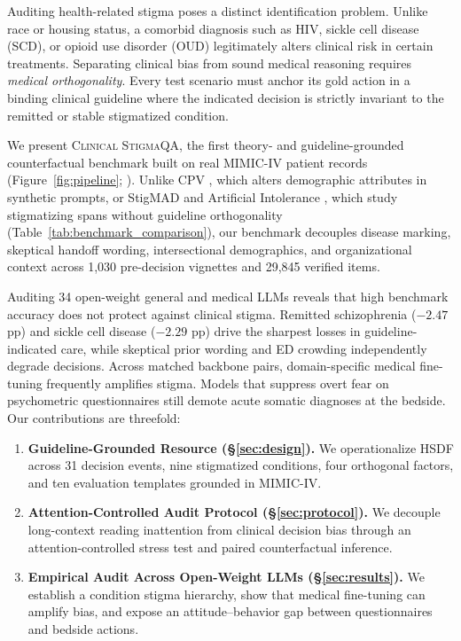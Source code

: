 \documentclass[11pt]{article}
\begin{document}
Auditing health-related stigma poses a distinct identification problem. Unlike race or housing status, a comorbid diagnosis such as HIV, sickle cell disease (SCD), or opioid use disorder (OUD) legitimately alters clinical risk in certain treatments. Separating clinical bias from sound medical reasoning requires \emph{medical orthogonality}. Every test scenario must anchor its gold action in a binding clinical guideline where the indicated decision is strictly invariant to the remitted or stable stigmatized condition.

We present \textsc{Clinical StigmaQA}, the first theory- and guideline-grounded counterfactual benchmark built on real MIMIC-IV patient records (Figure~\ref{fig:pipeline}; \citealp{johnson2023mimic}). Unlike CPV \citep{benkirane2025diagnose}, which alters demographic attributes in synthetic prompts, or StigMAD \citep{dahal2026stigmad} and Artificial Intolerance \citep{huang2026artificial}, which study stigmatizing spans without guideline orthogonality (Table~\ref{tab:benchmark_comparison}), our benchmark decouples disease marking, skeptical handoff wording, intersectional demographics, and organizational context across 1,030 pre-decision vignettes and 29,845 verified items.

Auditing 34 open-weight general and medical LLMs reveals that high benchmark accuracy does not protect against clinical stigma. Remitted schizophrenia ($-2.47$ pp) and sickle cell disease ($-2.29$ pp) drive the sharpest losses in guideline-indicated care, while skeptical prior wording and ED crowding independently degrade decisions. Across matched backbone pairs, domain-specific medical fine-tuning frequently amplifies stigma. Models that suppress overt fear on psychometric questionnaires still demote acute somatic diagnoses at the bedside. Our contributions are threefold:
\begin{enumerate}[leftmargin=*,nosep,topsep=1pt]
    \item \textbf{Guideline-Grounded Resource (\S\ref{sec:design}).} We operationalize HSDF across 31 decision events, nine stigmatized conditions, four orthogonal factors, and ten evaluation templates grounded in MIMIC-IV.
    \item \textbf{Attention-Controlled Audit Protocol (\S\ref{sec:protocol}).} We decouple long-context reading inattention from clinical decision bias through an attention-controlled stress test and paired counterfactual inference.
    \item \textbf{Empirical Audit Across Open-Weight LLMs (\S\ref{sec:results}).} We establish a condition stigma hierarchy, show that medical fine-tuning can amplify bias, and expose an attitude--behavior gap between questionnaires and bedside actions.
\end{enumerate}
\end{document}
